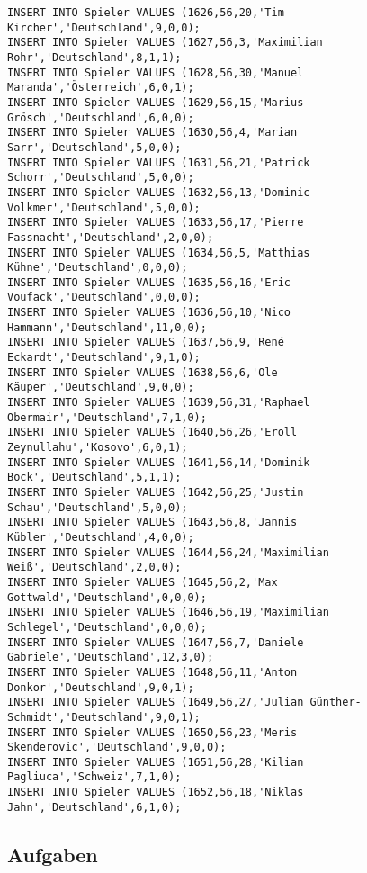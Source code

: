\documentclass{bschlangaul-aufgabe}
\begin{document}
\begin{verbatim}
INSERT INTO Spieler VALUES (1626,56,20,'Tim Kircher','Deutschland',9,0,0);
INSERT INTO Spieler VALUES (1627,56,3,'Maximilian Rohr','Deutschland',8,1,1);
INSERT INTO Spieler VALUES (1628,56,30,'Manuel Maranda','Österreich',6,0,1);
INSERT INTO Spieler VALUES (1629,56,15,'Marius Grösch','Deutschland',6,0,0);
INSERT INTO Spieler VALUES (1630,56,4,'Marian Sarr','Deutschland',5,0,0);
INSERT INTO Spieler VALUES (1631,56,21,'Patrick Schorr','Deutschland',5,0,0);
INSERT INTO Spieler VALUES (1632,56,13,'Dominic Volkmer','Deutschland',5,0,0);
INSERT INTO Spieler VALUES (1633,56,17,'Pierre Fassnacht','Deutschland',2,0,0);
INSERT INTO Spieler VALUES (1634,56,5,'Matthias Kühne','Deutschland',0,0,0);
INSERT INTO Spieler VALUES (1635,56,16,'Eric Voufack','Deutschland',0,0,0);
INSERT INTO Spieler VALUES (1636,56,10,'Nico Hammann','Deutschland',11,0,0);
INSERT INTO Spieler VALUES (1637,56,9,'René Eckardt','Deutschland',9,1,0);
INSERT INTO Spieler VALUES (1638,56,6,'Ole Käuper','Deutschland',9,0,0);
INSERT INTO Spieler VALUES (1639,56,31,'Raphael Obermair','Deutschland',7,1,0);
INSERT INTO Spieler VALUES (1640,56,26,'Eroll Zeynullahu','Kosovo',6,0,1);
INSERT INTO Spieler VALUES (1641,56,14,'Dominik Bock','Deutschland',5,1,1);
INSERT INTO Spieler VALUES (1642,56,25,'Justin Schau','Deutschland',5,0,0);
INSERT INTO Spieler VALUES (1643,56,8,'Jannis Kübler','Deutschland',4,0,0);
INSERT INTO Spieler VALUES (1644,56,24,'Maximilian Weiß','Deutschland',2,0,0);
INSERT INTO Spieler VALUES (1645,56,2,'Max Gottwald','Deutschland',0,0,0);
INSERT INTO Spieler VALUES (1646,56,19,'Maximilian Schlegel','Deutschland',0,0,0);
INSERT INTO Spieler VALUES (1647,56,7,'Daniele Gabriele','Deutschland',12,3,0);
INSERT INTO Spieler VALUES (1648,56,11,'Anton Donkor','Deutschland',9,0,1);
INSERT INTO Spieler VALUES (1649,56,27,'Julian Günther-Schmidt','Deutschland',9,0,1);
INSERT INTO Spieler VALUES (1650,56,23,'Meris Skenderovic','Deutschland',9,0,0);
INSERT INTO Spieler VALUES (1651,56,28,'Kilian Pagliuca','Schweiz',7,1,0);
INSERT INTO Spieler VALUES (1652,56,18,'Niklas Jahn','Deutschland',6,1,0);
\end{verbatim}
\subsection{Aufgaben}
\end{document}

